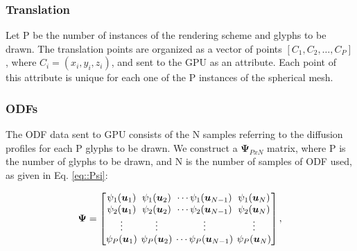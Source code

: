 \documentclass[twoside,twocolumn,10pt]{article}
\begin{document}

\subsubsection{Translation}
Let P be the number of instances of the rendering scheme and glyphs to be drawn. The translation points are organized as a vector of points $[C_1,C_2, \dots, C_P]$, where $C_i = (x_i, y_i, z_i)$, and sent to the GPU as an attribute. Each point of this attribute is unique for each one of the P instances of the spherical mesh.




\subsubsection{ODFs}

The ODF data sent to GPU consists of the N samples referring to the diffusion profiles for each P glyphs to be drawn. We construct a $\bm{\Psi}_{PxN}$ matrix, where P is the number of glyphs to be drawn, and N is the number of samples of ODF used, as given in Eq. \ref{eq::Psi}:

\begin{equation}
\label{eq::Psi}
\bm{\Psi} = 
\begingroup %
\setlength\arraycolsep{2pt}
\begin{bmatrix} 
    \psi_1(\bm{u}_1) & \psi_1(\bm{u}_2) & \cdots \psi_1(\bm{u}_{N-1}) & \psi_1(\bm{u}_{N})  \\    
     \psi_2(\bm{u}_1)& \psi_2(\bm{u}_2) & \cdots \psi_2(\bm{u}_{N-1}) & \psi_2(\bm{u}_{N}) \\
    \vdots & \vdots & \vdots & \vdots  \\    
     \psi_P(\bm{u}_1)&\psi_P(\bm{u}_2) & \cdots \psi_P(\bm{u}_{N-1}) & \psi_P(\bm{u}_{N})
\end{bmatrix}, 
\endgroup
\end{equation}
\end{document}
